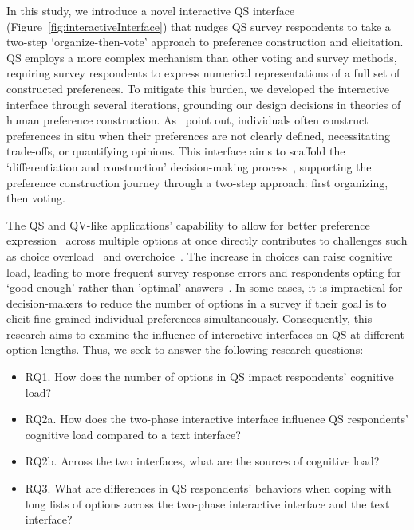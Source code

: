 In this study, we introduce a novel interactive QS interface (Figure~\ref{fig:interactiveInterface}) that nudges QS survey respondents to take a two-step `organize-then-vote' approach to preference construction and elicitation. QS employs a more complex mechanism than other voting and survey methods, requiring survey respondents to express numerical representations of a full set of constructed preferences. To mitigate this burden, we developed the interactive interface through several iterations, grounding our design decisions in theories of human preference construction. As~\textcite{lichtensteinConstructionPreference2006} point out, individuals often construct preferences in situ when their preferences are not clearly defined, necessitating trade-offs, or quantifying opinions. This interface aims to scaffold the `differentiation and construction' decision-making process~\textcite{svensonDifferentiationConsolidationTheory1992}, supporting the preference construction journey through a two-step approach: first organizing, then voting.


The QS and QV-like applications' capability to allow for better preference expression~\cite{chengCanShowWhat2021} across multiple options at once directly contributes to challenges such as choice overload~\cite{iyengarWhenChoiceDemotivating2000} and overchoice~\cite{gourvilleOverchoiceAssortmentType2005}. The increase in choices can raise cognitive load, leading to more frequent survey response errors and respondents opting for `good enough' rather than 'optimal' answers~\cite{lenznerCognitiveBurdenSurvey2010, blessAskingDifficultQuestions1992}. In some cases, it is impractical for decision-makers to reduce the number of options in a survey if their goal is to elicit fine-grained individual preferences simultaneously. Consequently, this research aims to examine the influence of interactive interfaces on QS at different option lengths. Thus, we seek to answer the following research questions:

\begin{itemize}
    \item RQ1. How does the number of options in QS impact respondents' cognitive load?
    \item RQ2a. How does the two-phase interactive interface influence QS respondents' cognitive load compared to a text interface?
    \item RQ2b. Across the two interfaces, what are the sources of cognitive load?
    \item RQ3. What are differences in QS respondents' behaviors when coping with long lists of options across the two-phase interactive interface and the text interface?
\end{itemize}

